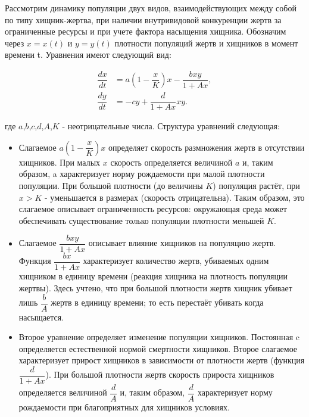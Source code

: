 \documentclass[a4paper,14pt]{extreport}
\begin{document}
    \par Рассмотрим динамику популяции двух видов, взаимодействующих между собой по типу хищник-жертва, при наличии внутривидовой конкуренции жертв за ограниченные ресурсы и при учете фактора насыщения хищника. Обозначим через $x=x(t)$ и $y=y(t)$ плотности популяций жертв и хищников в момент времени t. Уравнения имеют следующий вид:\par 

\begin{equation}
    \begin{aligned}
        \dfrac{d x}{d t} &= a\left(1-\dfrac{x}{K}\right)x - \dfrac{bxy}{1+Ax}, \\
        \dfrac{d y}{d t} &= -cy + \dfrac{d}{1+Ax}xy.
    \end{aligned}
\end{equation}


где $a$,$b$,$c$,$d$,$A$,$K$ - неотрицательные числа. Структура уравнений следующая:

\begin{itemize}
  \item 	Слагаемое $a\left(1-\dfrac{x}{K}\right)x$ определяет скорость размножения жертв в отсутствии хищников. При малых $x$ скорость определяется величиной $a$ и, таким образом, a характеризует норму рождаемости при малой плотности популяции. При большой плотности (до величины $K$) популяция растёт, при $x>K$ - уменьшается в размерах (скорость отрицательна). Таким образом, это слагаемое описывает ограниченность ресурсов: окружающая среда может обеспечивать существование только популяции плотности меньшей $K$.
  \item 	Слагаемое $\dfrac{bxy}{1+Ax}$ описывает влияние хищников на популяцию жертв. Функция $\dfrac{bx}{1+Ax}$ характеризует количество жертв, убиваемых одним хищником в единицу времени (реакция хищника на плотность популяции жертвы). Здесь учтено, что при большой плотности жертв хищник убивает лишь $\dfrac{b}{A}$ жертв в единицу времени; то есть перестаёт убивать когда насыщается.
  \item 	Второе уравнение определяет изменение популяции хищников. Постоянная c определяется естественной нормой смертности хищников. Второе слагаемое характеризует прирост хищников в зависимости от плотности жертв (функция $\dfrac{d}{1+Ax}$). При большой плотности жертв скорость прироста хищников определяется величиной $\dfrac{d}{A}$ и, таким образом, $\dfrac{d}{A}$ характеризует норму рождаемости при благоприятных для хищников условиях.
\end{itemize}
\end{document}
